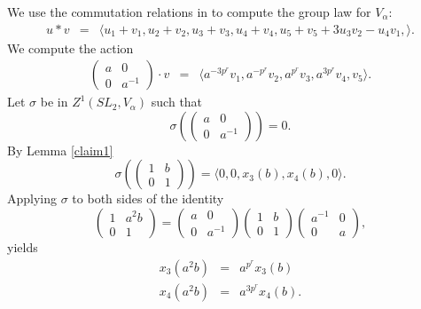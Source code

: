 \begin{example}
	We use the commutation relations in \cite[\S 33.5]{humphreys1975linear} to compute the group law for $V_\alpha$:
	\begin{eqnarray*}
		u * v &=&
		\langle
		u_1 + v_1,
		u_2 + v_2,
		u_3 + v_3,
		u_4 + v_4,
		u_5 + v_5 + 3u_3v_2 - u_4v_1,
		\rangle.
	\end{eqnarray*}
		We compute the action
	\begin{eqnarray*}
		\left(\begin{matrix} a & 0 \\ 0 & a^{-1} \end{matrix}\right)\cdot v &=&
		\langle 
		a^{-3p^r}v_1,
		a^{-p^r}v_2,
		a^{p^r}v_3,
		a^{3p^r}v_4,
		v_5
		\rangle.
	\end{eqnarray*}
	Let $\sigma$ be in $Z^1(SL_2, V_\alpha)$ such that
	\begin{displaymath}
		\sigma\left(\left(\begin{matrix}a & 0\\0 & a^{-1}\end{matrix}\right)\right) = 0.
	\end{displaymath}
	By Lemma \ref{claim1}
	\begin{displaymath}
		\sigma\left(\left(\begin{matrix} 1 & b \\ 0 & 1 \end{matrix}\right)\right) =
		\langle 
		0,
		0,
		x_3(b),
		x_4(b),
		0
		\rangle.
	\end{displaymath}
	Applying $\sigma$ to both sides of the identity
	\begin{displaymath}
		\left(\begin{matrix} 1 & a^2b \\ 0 & 1 \end{matrix}\right)
		= 
		\left(\begin{matrix} a & 0 \\ 0 & a^{-1} \end{matrix}\right)
		\left(\begin{matrix} 1 & b \\ 0 & 1 \end{matrix}\right)
		\left(\begin{matrix} a^{-1} & 0 \\ 0 & a \end{matrix}\right),
	\end{displaymath}
	yields
	\begin{eqnarray*}
		x_3(a^2b) &=& a^{p^r}x_3(b)\\
		x_4(a^2b) &=& a^{3p^r}x_4(b).

\end{eqnarray*}
\end{example}
